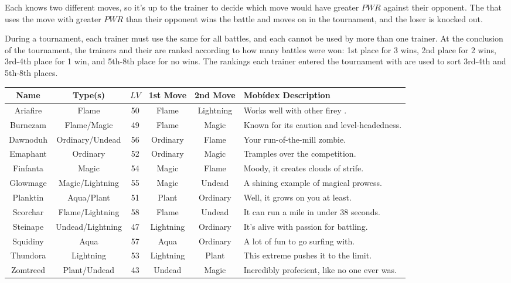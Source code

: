 Each \mappMobimon{} knows two different moves, so it's up to the
trainer to decide which move would have greater \(PWR\) against their
opponent. The \mappMobimon{} that uses the move with greater \(PWR\) than
their opponent wins the battle and moves on in the tournament, and the
loser is knocked out.

During a tournament, each trainer must use the same \mappMobimon{} for all
battles, and each \mappMobimon{} cannot be used by more than one trainer.
At the conclusion of the tournament, the trainers and their
\mappMobimon{} are ranked according
to how many battles were won: 1st place for 3 wins, 2nd place for 2 wins,
3rd-4th place for 1 win, and 5th-8th place for no wins. The rankings each
trainer entered the tournament with are used to sort 3rd-4th and 5th-8th
places.


\begin{center}
\begin{tabular}{|c|c|c|c|c|p{2in}|}\hline
  Name & Type(s) & \(LV\) & 1st Move & 2nd Move & Mob\'idex Description \\\hline\hline
  Ariafire & Flame & 50 & Flame & Lightning &
    Works well with other firey \mappMobimon{}. \\\hline
  Burnezam & Flame/Magic & 49 & Flame & Magic &
    Known for its caution and level-headedness. \\\hline
  Dawnoduh & Ordinary/Undead & 56 & Ordinary & Flame &
    Your run-of-the-mill zombie. \\\hline
  Emaphant & Ordinary & 52 & Ordinary & Magic &
    Tramples over the competition. \\\hline
  Finfanta & Magic & 54 & Magic & Flame &
    Moody, it creates clouds of strife. \\\hline
  Glowmage & Magic/Lightning & 55 & Magic & Undead &
    A shining example of magical prowess. \\\hline
  Planktin & Aqua/Plant & 51 & Plant & Ordinary &
    Well, it grows on you at least. \\\hline
  Scorchar & Flame/Lightning & 58 & Flame & Undead &
    It can run a mile in under 38 seconds. \\\hline
  Steinape & Undead/Lightning & 47 & Lightning & Ordinary &
    It's alive with passion for battling. \\\hline
  Squidiny & Aqua & 57 & Aqua & Ordinary &
    A lot of fun to go surfing with. \\\hline
  Thundora & Lightning & 53 & Lightning & Plant &
    This extreme \mappMobimon{} pushes it to the limit. \\\hline
  Zomtreed & Plant/Undead & 43 & Undead & Magic &
    Incredibly profecient, like no one ever was. \\\hline
\end{tabular}
\end{center}


